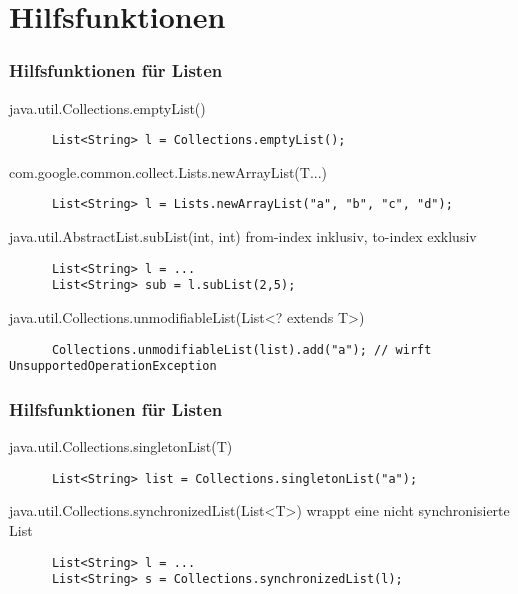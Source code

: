 \section{Hilfsfunktionen}

\begin{frame}[fragile]
  \frametitle{Hilfsfunktionen für Listen}
  \begin{block}{java.util.Collections.emptyList()}
    \begin{lstlisting}
      List<String> l = Collections.emptyList();
    \end{lstlisting}
  \end{block}
  \pause
  \begin{block}{com.google.common.collect.Lists.newArrayList(T...)}
    \begin{lstlisting}
      List<String> l = Lists.newArrayList("a", "b", "c", "d");
    \end{lstlisting}
  \end{block}
  \pause
  \begin{block}{java.util.AbstractList.subList(int, int)}
    from-index inklusiv, to-index exklusiv
    \begin{lstlisting}
      List<String> l = ...
      List<String> sub = l.subList(2,5);
    \end{lstlisting}
  \end{block}
  \pause
  \begin{block}{java.util.Collections.unmodifiableList(List\textless? extends T\textgreater)}
    \begin{lstlisting}
      Collections.unmodifiableList(list).add("a"); // wirft UnsupportedOperationException
    \end{lstlisting}
  \end{block}
\end{frame}
\begin{frame}[fragile]
  \frametitle{Hilfsfunktionen für Listen}
  \begin{block}{java.util.Collections.singletonList(T)}
    \begin{lstlisting}
      List<String> list = Collections.singletonList("a");
    \end{lstlisting}
  \end{block}
  \pause
  \begin{block}{java.util.Collections.synchronizedList(List\textless T\textgreater)}
    wrappt eine nicht synchronisierte List
    \begin{lstlisting}
      List<String> l = ...
      List<String> s = Collections.synchronizedList(l);
    \end{lstlisting}
  \end{block}
\end{frame}

